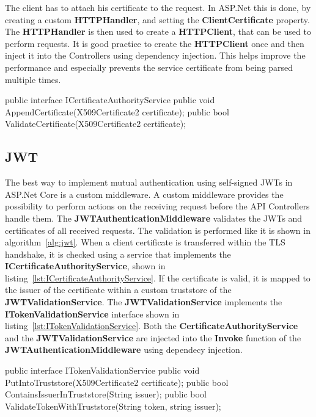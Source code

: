 The client has to attach his certificate to the request.
In ASP.Net this is done, by creating a custom \textbf{HTTPHandler}, and setting the \textbf{ClientCertificate} property.
The \textbf{HTTPHandler} is then used to create a \textbf{HTTPClient}, that can be used to perform requests.
It is good practice to create the \textbf{HTTPClient} once and then inject it into the Controllers using dependency injection.
This helps improve the performance and especially prevents the service certificate from being parsed multiple times.

\noindent \begin{minipage}{\linewidth}
	\begin{CsCode}[label={lst:ICertificateAuthorityService}, caption={ICertificateAuthorityService interface that is, implemented by the injected CertificateAuthorityService},captionpos=b]
		public interface ICertificateAuthorityService {
			public void AppendCertificate(X509Certificate2 certificate);
			public bool ValidateCertificate(X509Certificate2 certificate);
		}
	\end{CsCode}
\end{minipage}

\subsection{JWT}
The best way to implement mutual authentication using self-signed JWTs in ASP.Net Core is a custom middleware.
A custom middleware provides the possibility to perform actions on the receiving request before the API Controllers handle them.
The \textbf{JWTAuthenticationMiddleware} validates the JWTs and certificates of all received requests.
The validation is performed like it is shown in algorithm~\ref{alg:jwt}.
When a client certificate is transferred within the TLS handshake, it is checked using a service that implements the \textbf{ICertificateAuthorityService}, shown in listing~\ref{lst:ICertificateAuthorityService}.
If the certificate is valid, it is mapped to the issuer of the certificate within a custom truststore of the \textbf{JWTValidationService}.
The \textbf{JWTValidationService} implements the \textbf{ITokenValidationService} interface shown in listing~\ref{lst:ITokenValidationService}.
Both the \textbf{CertificateAuthorityService} and the \textbf{JWTValidationService} are injected into the \textbf{Invoke} function of the \textbf{JWTAuthenticationMiddleware} using dependecy injection.

\noindent \begin{minipage}{\linewidth}
	\begin{CsCode}[label={lst:ITokenValidationService}, caption={ITokenValidationService interface, that is implemented by the injected JWTValidationService},captionpos=b]
		public interface ITokenValidationService {
			public void PutIntoTruststore(X509Certificate2 certificate);
			public bool ContainsIssuerInTruststore(String issuer);
			public bool ValidateTokenWithTruststore(String token, string issuer);
		}
	\end{CsCode}
\end{minipage}

